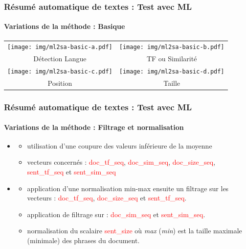 \documentclass[xcolor=table]{beamer}
\begin{document}
\begin{frame}
\frametitle{Résumé automatique de textes : Test avec ML}
\framesubtitle{Variations de la méthode : Basique}

\vspace{-6pt}
\begin{center}
	\begin{tabular}{cc}
	\texttt{[image: img/ml2sa-basic-a.pdf]}
	&
	\texttt{[image: img/ml2sa-basic-b.pdf]}
	\\
	Détection Langue & TF ou Similarité\\
	\texttt{[image: img/ml2sa-basic-c.pdf]}
	&
	\texttt{[image: img/ml2sa-basic-d.pdf]}
	\\
	Position & Taille \\
\end{tabular}
\end{center}
	
\end{frame}

\begin{frame}
\frametitle{Résumé automatique de textes : Test avec ML}
\framesubtitle{Variations de la méthode : Filtrage et normalisation}

\begin{itemize}
	\item {}
	\begin{itemize}
		\item utilisation d'une coupure des valeurs inférieure de la moyenne 
		\item vecteurs concernés : \textcolor{red}{doc\_tf\_seq}, \textcolor{red}{doc\_sim\_seq}, \textcolor{red}{doc\_size\_seq}, \textcolor{red}{sent\_tf\_seq} et \textcolor{red}{sent\_sim\_seq}
	\end{itemize}

	\item {}
	\begin{itemize}
		\item application d'une normalisation min-max ensuite un filtrage sur les vecteurs : \textcolor{red}{doc\_tf\_seq}, \textcolor{red}{doc\_size\_seq} et \textcolor{red}{sent\_tf\_seq}. 
		\item application de filtrage sur : \textcolor{red}{doc\_sim\_seq} et \textcolor{red}{sent\_sim\_seq}. 
		\item normalisation du scalaire \textcolor{red}{sent\_size} où \textit{max} (\textit{min}) est la taille maximale (minimale) des phrases du document.
	\end{itemize}
\end{itemize}
	
\end{frame}
\end{document}
